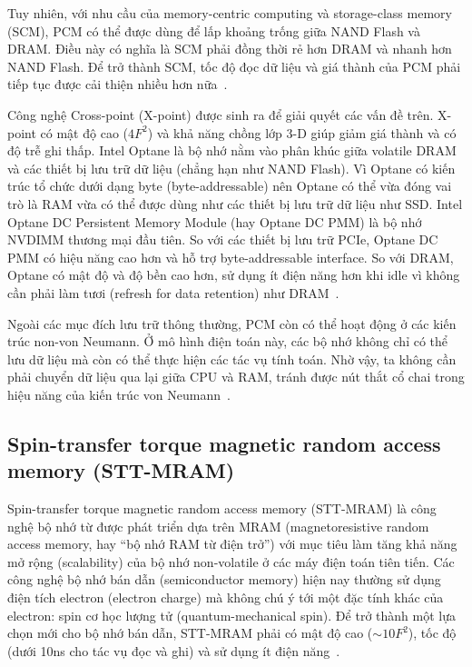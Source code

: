 Tuy nhiên, với nhu cầu của memory-centric computing và storage-class memory
(SCM), PCM có thể được dùng để lấp khoảng trống giữa NAND Flash và DRAM. Điều
này có nghĩa là SCM phải đồng thời rẻ hơn DRAM và nhanh hơn NAND Flash. Để trở
thành SCM, tốc độ đọc dữ liệu và giá thành của PCM phải tiếp tục được cải thiện
nhiều hơn nữa~\cite{kimEvolutionPhaseChangeMemory2020}.

Công nghệ Cross-point (X-point) được sinh ra để giải quyết các vấn đề trên.
X-point có mật độ cao ($4F^2$) và khả năng chồng lớp 3-D giúp giảm giá thành và
có độ trễ ghi thấp. Intel Optane là bộ nhớ nằm vào phân khúc giữa volatile DRAM
và các thiết bị lưu trữ dữ liệu (chẳng hạn như NAND Flash). Vì Optane có kiến
trúc tổ chức dưới dạng byte (byte-addressable) nên Optane có thể vừa đóng vai
trò là RAM vừa có thể được dùng như các thiết bị lưu trữ dữ liệu như SSD. Intel
Optane DC Persistent Memory Module (hay Optane DC PMM) là bộ nhớ NVDIMM thương
mại đầu tiên. So với các thiết bị lưu trữ PCIe, Optane DC PMM có hiệu năng cao
hơn và hỗ trợ byte-addressable interface. So với DRAM, Optane có mật độ và độ
bền cao hơn, sử dụng ít điện năng hơn khi idle vì không cần phải làm tươi
(refresh for data retention) như
DRAM~\cite{izraelevitzBasicPerformanceMeasurements2019}.

Ngoài các mục đích lưu trữ thông thường, PCM còn có thể hoạt động ở các kiến
trúc non-von Neumann. Ở mô hình điện toán này, các bộ nhớ không chỉ có thể lưu
dữ liệu mà còn có thể thực hiện các tác vụ tính toán. Nhờ vậy, ta không cần
phải chuyển dữ liệu qua lại giữa CPU và RAM, tránh được nút thắt cổ chai trong
hiệu năng của kiến trúc von Neumann~\cite{galloOverviewPhasechangeMemory2020}.

\subsection{Spin-transfer torque magnetic random access memory (STT-MRAM)}
Spin-transfer torque magnetic random access memory (STT-MRAM) là công nghệ bộ
nhớ từ được phát triển dựa trên MRAM (magnetoresistive random access memory,
hay ``bộ nhớ RAM từ điện trở'') với mục tiêu làm tăng khả năng mở rộng
(scalability) của bộ nhớ non-volatile ở các máy điện toán tiên tiến. Các công
nghệ bộ nhớ bán dẫn (semiconductor memory) hiện nay thường sử dụng điện tích
electron (electron charge) mà không chú ý tới một đặc tính khác của electron:
spin cơ học lượng tử (quantum-mechanical spin). Để trở thành một lựa chọn mới
cho bộ nhớ bán dẫn, STT-MRAM phải có mật độ cao ($\sim10F^2$), tốc độ (dưới
10ns cho tác vụ đọc và ghi) và sử dụng ít điện
năng~\cite{apalkovSpintransferTorqueMagnetic2013}.

